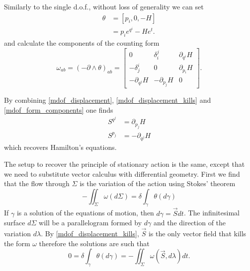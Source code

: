 \documentclass[fleqn,10pt]{wlscirep}
\begin{document}
Similarly to the single d.o.f., without loss of generality we can set
\begin{equation}\label{mdof_potential_expression}
	\begin{aligned}
		\theta &= [p_i, 0, -H] \\
		&= p_i e^{q^i} - H e^t.
	\end{aligned}
\end{equation}
and calculate the components of the counting form
\begin{equation}\label{mdof_form_components}
	\omega_{ab} = (-\partial\wedge\theta)_{ab} = \begin{bmatrix}
		0 & \delta^j_i & \partial_{q^i} H \\
		-\delta^i_j & 0 & \partial_{p_i} H \\
		-\partial_{q^j} H & -\partial_{p_j} H & 0
	\end{bmatrix}.
\end{equation}

By combining \ref{mdof_displacement}, \ref{mdof_displacement_kills} and \ref{mdof_form_components} one finds
\begin{equation}\label{mdof_Ham_eq}
	\begin{aligned}
		S^{q^j} &= \partial_{p_j} H \\
		S^{p_j} &= - \partial_{q^j} H
	\end{aligned}
\end{equation}
which recovers Hamilton's equations.

The setup to recover the principle of stationary action is the same, except that we need to substitute vector calculus with differential geometry. First we find that the flow through $\Sigma$ is the variation of the action using Stokes' theorem
\begin{equation}\label{mdof_action}
	- \iint_{\Sigma} \omega(d\Sigma) = \delta \int_{\gamma} \theta(d\gamma) 
\end{equation}
If $\gamma$ is a solution of the equations of motion, then $d\gamma = \vec{S} dt$. The infinitesimal surface $d\Sigma$ will be a parallelogram formed by $d\gamma$ and the direction of the variation $d\lambda$. By \ref{mdof_displacement_kills}, $\vec{S}$ is the only vector field that kills the form $\omega$ therefore the solutions are such that
\begin{equation}\label{mdof_stationary_action}
	0 = \delta \int_{\gamma} \theta(d\gamma) = - \iint_{\Sigma} \omega(\vec{S}, d\lambda) dt. 
\end{equation}
\end{document}
